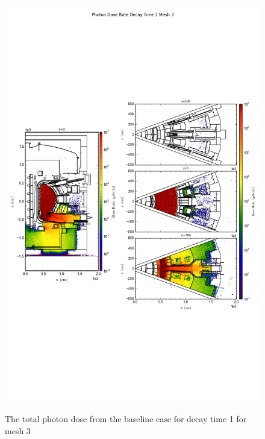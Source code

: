 \begin{figure}[ht!]
\centering
\includegraphics[trim={0cm 9cm 0cm 10cm},clip,scale=0.75]{../plots/final_model/Photon_Dose_Rate_Decay_Time_1_Mesh_3.png}
\label{fig:photons_dc1_no4bc_m3_flux}
\caption{The total photon dose from the baseline case for decay time 1 for mesh 3}
\end{figure}
